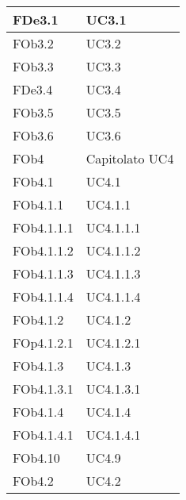 \begin{longtable}{|l|p{4cm}|}
\hline
FDe3.1 & UC3.1 \linebreak  \\ 
\hline
FOb3.2 & UC3.2 \linebreak  \\ 
\hline
FOb3.3 & UC3.3 \linebreak  \\ 
\hline
FDe3.4 & UC3.4 \linebreak  \\ 
\hline
FOb3.5 & UC3.5 \linebreak  \\ 
\hline
FOb3.6 & UC3.6 \linebreak  \\ 
\hline
FOb4 & Capitolato \linebreak UC4 \linebreak \\ 
\hline
FOb4.1 & UC4.1 \linebreak  \\ 
\hline
FOb4.1.1 & UC4.1.1 \linebreak  \\ 
\hline
FOb4.1.1.1 & UC4.1.1.1 \linebreak  \\ 
\hline
FOb4.1.1.2 & UC4.1.1.2 \linebreak  \\ 
\hline
FOb4.1.1.3 & UC4.1.1.3 \linebreak  \\ 
\hline
FOb4.1.1.4 & UC4.1.1.4 \linebreak  \\ 
\hline
FOb4.1.2 & UC4.1.2 \linebreak  \\ 
\hline
FOp4.1.2.1 & UC4.1.2.1 \linebreak  \\ 
\hline
FOb4.1.3 & UC4.1.3 \linebreak  \\ 
\hline
FOb4.1.3.1 & UC4.1.3.1 \linebreak  \\ 
\hline
FOb4.1.4 & UC4.1.4 \linebreak  \\ 
\hline
FOb4.1.4.1 & UC4.1.4.1 \linebreak  \\ 
\hline
FOb4.10 & UC4.9 \linebreak  \\ 
\hline
FOb4.2 & UC4.2 \linebreak  \\ 

\end{longtable}
